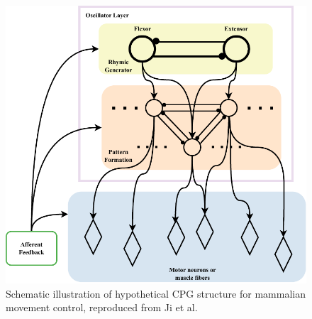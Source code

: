 \begin{figure}[ht]
    \centering
    \includegraphics[width=0.75\linewidth]{img/chap2/CPG.pdf}
    \caption{Schematic illustration of hypothetical \ac{CPG} structure for mammalian movement control, reproduced from Ji et al.\cite{liHumanoidsLearningWalk2013}}
    \label{fig:cpg_structure}
\end{figure}
